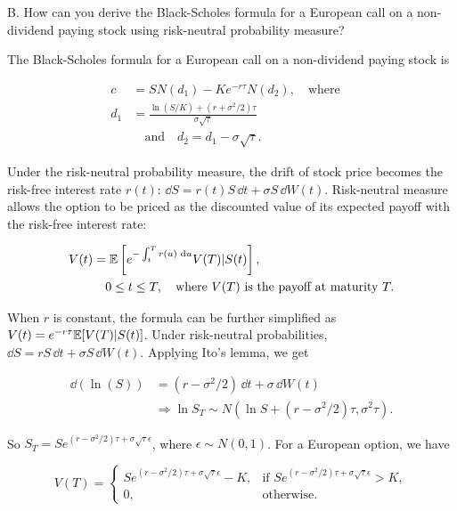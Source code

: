 \begin{problem}{B. How can you derive the Black-Scholes formula for a European call on a non-dividend
paying stock using risk-neutral probability measure?}
\end{problem}

\begin{solution}
The Black-Scholes formula for a European call on a non-dividend paying stock is

\[
\begin{aligned}
c&=SN(d_1)-Ke^{-r\tau}N(d_2),\quad\text{where}\quad\\
d_1&=\frac{\ln(S/K)+(r+\sigma^2/2)\tau}{\sigma\sqrt{\tau}}\\
&\quad\text{and}\quad d_2=d_1-\sigma\sqrt{\tau}.
\end{aligned}
\]


Under the risk-neutral probability measure, the drift of stock price becomes the risk-free
interest rate $r(t)$: $\dd S=r(t)S\,\dd t+\sigma S\,\dd W(t)$. Risk-neutral measure allows the option to be
priced as the discounted value of its expected payoff with the risk-free interest rate:

\[
\begin{aligned}
V(t)&=\mathbb{E}\left[ e^{-\int_t^T r(u)\,\mathop{}\!\mathrm{d} u}V(T)\vert S(t)\right],\\
&\quad 0\le t\le T,\quad\text{where }V(T)\text{ is the payoff at maturity }T.
\end{aligned}
\]

When $r$ is constant, the formula can be further simplified as
$V(t)=e^{-r\tau}\mathbb{E}[V(T)\vert S(t)]$.
Under risk-neutral probabilities, $\dd S=rS\,\dd t+\sigma S\,\dd W(t)$. Applying Ito's lemma, we get

\[
\begin{aligned}
\dd(\ln(S))&=(r-\sigma^2/2)\,\dd t+\sigma\,\dd W(t)\\
&\Rightarrow \ln S_T\sim N\left(\ln S+(r-\sigma^2/2)\tau,\sigma^2\tau\right).
\end{aligned}
\]

So $S_T=Se^{(r-\sigma^2/2)\tau+\sigma\sqrt{\tau}\epsilon}$, where $\epsilon\sim N(0,1)$. For a
European option, we have

\[
V(T)=
\begin{cases}
Se^{(r-\sigma^2/2)\tau+\sigma\sqrt{\tau}\epsilon}-K,
&\text{if }Se^{(r-\sigma^2/2)\tau+\sigma\sqrt{\tau}\epsilon}>K,\\
0,&\text{otherwise}.
\end{cases}
\]


\end{solution}
